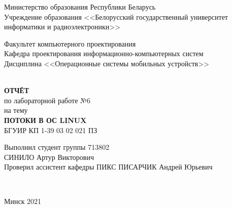 
\begin{titlepage}
  \begin{center}
    Министерство образования Республики Беларусь\\
    Учреждение образования <<Белорусский государственный университет информатики и радиоэлектроники>>\\[2em]

    \begin{minipage}{\textwidth}
      \begin{flushleft}
		  Факультет компьютерного проектирования\\[1em]

		  Кафедра проектирования информационно-компьютерных систем\\[1em]

          Дисциплина <<Операционные системы мобильных устройств>>
      \end{flushleft}
    \end{minipage}\\[5em]

	\textbf{\MakeTextUppercase{Отчёт}}\\
    {по лабораторной работе №6}\\
	{на тему}\\[1em]
	\textbf{\MakeTextUppercase{ПОТОКИ В ОС LINUX}}\\[1em]

	{БГУИР КП 1-39 03 02 021 ПЗ}\\[5em]

    \begin{flushright}
      \begin{minipage}{0.5\textwidth}
        \begin{flushleft}
          Выполнил студент группы 713802\\
		  \MakeTextUppercase{Синило} Артур Викторович\\[2em]

          Проверил ассистент кафедры ПИКС
		  \MakeTextUppercase{Писарчик} Андрей Юрьевич
        \end{flushleft}
      \end{minipage}\\[2.2em]
    \end{flushright}

        \vfill
    {\normalsize Минск 2021}
  \end{center}
\end{titlepage}
